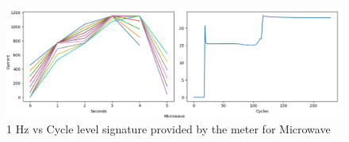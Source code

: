 \begin{figure} 
	\centering
	\includegraphics[width=1\linewidth]{images/H10Microwave}
	\caption[1 Hz vs Cycle level signature provided by the meter for Microwave]{1 Hz vs Cycle level signature provided by the meter for Microwave}
	\label{fig:H10Microwave}
\end{figure}
